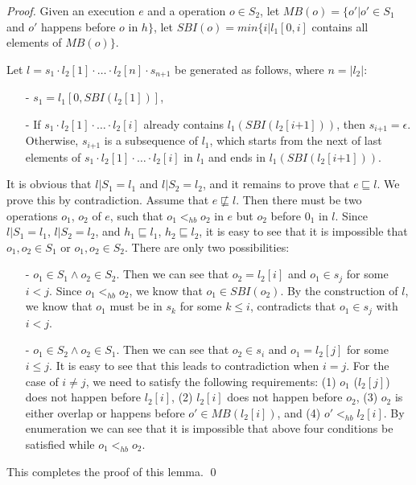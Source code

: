 \begin {proof}

Given an execution $e$ and a operation $o \in S_2$, let $\textit{MB}(o) = \{ o' \vert o' \in S_1$ and $o'$ happens before $o$ in $h \}$, let $\textit{SBI}(o) = \textit{min}\{ i \vert l_1[0,i]$ contains all elements of $\textit{MB}(o) \}$.

Let $l = s_1 \cdot l_2[1] \cdot \ldots \cdot l_2[n] \cdot s_{\textit{n+1}}$ be generated as follows, where $n = \vert l_2 \vert$:

\begin{itemize}
\setlength{\itemsep}{0.5pt}
\item[-] $s_1 = l_1[0, \textit{SBI}(l_2[1])]$,

\item[-] If $s_1 \cdot l_2[1] \cdot \ldots \cdot l_2[i]$ already contains $l_1(\textit{SBI}(l_2[\textit{i+1}]))$, then $s_{\textit{i+1}} = \epsilon$. Otherwise, $s_{\textit{i+1}}$ is a subsequence of $l_1$, which starts from the next of last elements of $s_1 \cdot l_2[1] \cdot \ldots \cdot l_2[i]$ in $l_1$ and ends in $l_1(\textit{SBI}(l_2[\textit{i+1}]))$.
\end{itemize}

It is obvious that $l \vert{S_1} = l_1$ and $l \vert{S_2} = l_2$, and it remains to prove that $e \sqsubseteq l$. We prove this by contradiction. Assume that $e \not \sqsubseteq l$. Then there must be two operations $o_1$, $o_2$ of $e$, such that $o_1 <_{hb} o_2$ in $e$ but $o_2$ before $0_1$ in $l$. Since $l \vert{S_1} = l_1$, $l \vert{S_2} = l_2$, and $h_1 \sqsubseteq l_1$, $h_2 \sqsubseteq l_2$, it is easy to see that it is impossible that $o_1,o_2 \in S_1$ or $o_1,o_2 \in S_2$. There are only two possibilities:

\begin{itemize}
\setlength{\itemsep}{0.5pt}
\item[-] $o_1 \in S_1 \wedge o_2 \in S_2$. Then we can see that $o_2=l_2[i]$ and $o_1 \in s_j$ for some $i < j$. Since $o_1 <_{hb} o_2$, we know that $o_1 \in \textit{SBI}(o_2)$. By the construction of $l$, we know that $o_1$ must be in $s_k$ for some $k \leq i$, contradicts that $o_1 \in s_j$ with $i < j$.

\item[-] $o_1 \in S_2 \wedge o_2 \in S_1$. Then we can see that $o_2 \in s_i$ and $o_1 = l_2[j]$ for some $i \leq j$. It is easy to see that this leads to contradiction when $i = j$. For the case of $i \neq j$, we need to satisfy the following requirements: (1) $o_1$ ($l_2[j]$) does not happen before $l_2[i]$, (2) $l_2[i]$ does not happen before $o_2$, (3) $o_2$ is either overlap or happens before $o' \in \textit{MB}(l_2[i])$, and (4) $o' <_{hb} l_2[i]$. By enumeration we can see that it is impossible that above four conditions be satisfied while $o_1 <_{hb} o_2$.
\end{itemize}

This completes the proof of this lemma. \qed
\end {proof}


